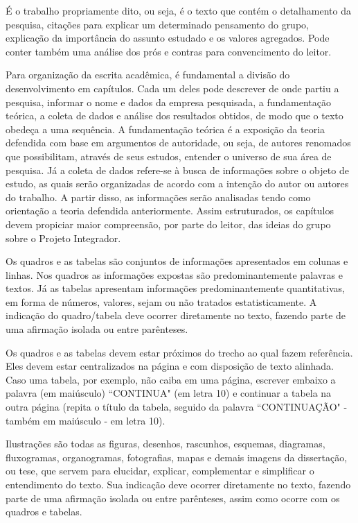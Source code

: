 \documentclass[
	12pt,				%
	openright,			%
	oneside,			%
	a4paper,			%
	english,			%
	french,				%
	spanish,			%
	brazil				%
	]{abntex2}
\begin{document}
\par É o trabalho propriamente dito, ou seja, é o texto que contém o detalhamento da pesquisa, citações para explicar um determinado pensamento do grupo, explicação da importância do assunto estudado e os valores agregados. Pode conter também uma análise dos prós e contras para convencimento do leitor.
\par Para organização da escrita acadêmica, é fundamental a divisão do desenvolvimento em capítulos. Cada um deles pode descrever de onde partiu a pesquisa, informar o nome e dados da empresa pesquisada, a fundamentação teórica, a coleta de dados e análise dos resultados obtidos, de modo que o texto obedeça a uma sequência. A fundamentação teórica é a exposição da teoria defendida com base em argumentos de autoridade, ou seja, de autores renomados que possibilitam, através de seus estudos, entender o universo de sua área de pesquisa. Já a coleta de dados refere-se à busca de informações sobre o objeto de estudo, as quais serão organizadas de acordo com a intenção do autor ou autores do trabalho. A partir disso, as informações serão analisadas tendo como orientação a teoria defendida anteriormente. Assim estruturados, os capítulos devem propiciar maior compreensão, por parte do leitor, das ideias do grupo sobre o Projeto Integrador.
\par Os quadros e as tabelas são conjuntos de informações apresentados em colunas e linhas. Nos quadros as informações expostas são predominantemente palavras e textos. Já as tabelas apresentam informações predominantemente quantitativas, em forma de números, valores, sejam ou não tratados estatisticamente. A indicação do quadro/tabela deve ocorrer diretamente no texto, fazendo parte de uma afirmação isolada ou entre parênteses.  

\par Os quadros e as tabelas devem estar próximos do trecho ao qual fazem referência. Eles devem estar centralizados na página e com disposição de texto alinhada. Caso uma tabela, por exemplo, não caiba em uma página, escrever embaixo a palavra (em maiúsculo) ``CONTINUA" (em letra 10) e continuar a tabela na outra página (repita o título da tabela, seguido da palavra ``CONTINUAÇÃO" - também em maiúsculo - em letra 10).
\par Ilustrações são todas as figuras, desenhos, rascunhos, esquemas, diagramas, fluxogramas, organogramas, fotografias, mapas e demais imagens da dissertação, ou tese, que servem para elucidar, explicar, complementar e simplificar o entendimento do texto. Sua indicação deve ocorrer diretamente no texto, fazendo parte de uma afirmação isolada ou entre parênteses, assim como ocorre com os quadros e tabelas. 
\end{document}
